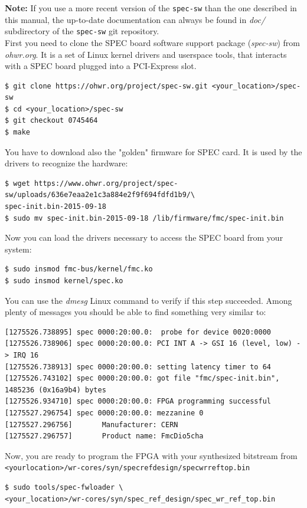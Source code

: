 \documentclass[a4paper, 12pt]{article}
\renewcommand{\_}{\underscore\allowbreak}
\begin{document}
\textbf{Note:} If you use a more recent version of the \texttt{spec-sw} than the
one described in this manual, the up-to-date documentation can always be found
in \textit{doc/} subdirectory of the \texttt{spec-sw} git repository.\\

First you need to clone the SPEC board software support package
(\textit{spec-sw}) from \textit{ohwr.org}. It is a set of Linux kernel drivers and
userspace tools, that interacts with a SPEC board plugged into a PCI-Express
slot.\\

\begin{lstlisting}
$ git clone https://ohwr.org/project/spec-sw.git <your_location>/spec-sw
$ cd <your_location>/spec-sw
$ git checkout 0745464
$ make
\end{lstlisting}

You have to download also the "golden" firmware for SPEC card. It is used by
the drivers to recognize the hardware:
\begin{lstlisting}
$ wget https://www.ohwr.org/project/spec-sw/uploads/636e7eaa2e1c3a884e2f9f694fdfd1b9/\
spec-init.bin-2015-09-18
$ sudo mv spec-init.bin-2015-09-18 /lib/firmware/fmc/spec-init.bin
\end{lstlisting}

Now you can load the drivers necessary to access the SPEC board from your
system:
\begin{lstlisting}
$ sudo insmod fmc-bus/kernel/fmc.ko
$ sudo insmod kernel/spec.ko
\end{lstlisting}

You can use the \textit{dmesg} Linux command to verify if this step succeeded.
Among plenty of messages you should be able to find something very similar to:
\begin{lstlisting}[basicstyle=\scriptsize\ttfamily]
[1275526.738895] spec 0000:20:00.0:  probe for device 0020:0000
[1275526.738906] spec 0000:20:00.0: PCI INT A -> GSI 16 (level, low) -> IRQ 16
[1275526.738913] spec 0000:20:00.0: setting latency timer to 64
[1275526.743102] spec 0000:20:00.0: got file "fmc/spec-init.bin", 1485236 (0x16a9b4) bytes
[1275526.934710] spec 0000:20:00.0: FPGA programming successful
[1275527.296754] spec 0000:20:00.0: mezzanine 0
[1275527.296756]       Manufacturer: CERN
[1275527.296757]       Product name: FmcDio5cha
\end{lstlisting}

Now, you are ready to program the FPGA with your synthesized bitstream from
\texttt{<your\_location>/wr-cores/syn/spec\_ref\_design/spec\_wr\_ref\_top.bin}
\begin{lstlisting}
$ sudo tools/spec-fwloader \
<your_location>/wr-cores/syn/spec_ref_design/spec_wr_ref_top.bin
\end{lstlisting}
\end{document}
